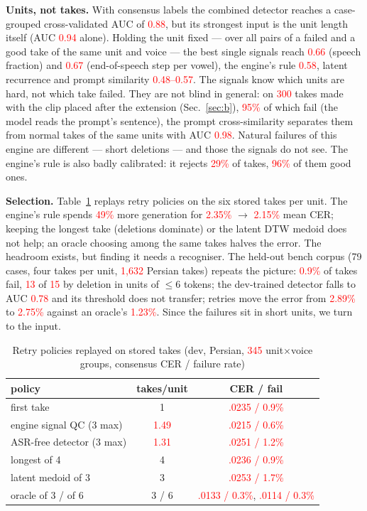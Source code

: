 \documentclass[conference]{IEEEtran}
\newcommand{\RES}[1]{\textcolor{red}{#1}}
\begin{document}
\textbf{Units, not takes.} With consensus labels the combined detector reaches a case-grouped
cross-validated AUC of \RES{0.88}, but its strongest input is the unit length itself (AUC \RES{0.94} alone).
Holding the unit fixed --- over all pairs of a failed and a good take of the same unit and voice --- the best
single signals reach \RES{0.66} (speech fraction) and \RES{0.67} (end-of-speech step per vowel), the engine's
rule \RES{0.58}, latent recurrence and prompt similarity \RES{0.48--0.57}. The signals know which units are
hard, not which take failed. They are not blind in general: on \RES{300} takes made with the clip placed
after the extension (Sec.~\ref{sec:b}), \RES{95\%} of which fail (the model reads the prompt's sentence), the prompt cross-similarity
separates them from normal takes of the same units with AUC \RES{0.98}. Natural failures of this engine are
different --- short deletions --- and those the signals do not see. The engine's rule is also badly calibrated: it rejects \RES{29\%} of takes,
\RES{96\%} of them good ones.

\textbf{Selection.} Table~\ref{tab:sel} replays retry policies on the six stored takes per unit. The
engine's rule spends \RES{49\%} more generation for \RES{2.35\%} $\to$ \RES{2.15\%} mean CER; keeping the
longest take (deletions dominate) or the latent DTW medoid does not help; an oracle choosing among the same
takes halves the error. The headroom exists, but finding it needs a recogniser. The held-out bench corpus (79 cases, four
takes per unit, \RES{1{,}632} Persian takes) repeats the picture: \RES{0.9\%} of takes fail, \RES{13} of
\RES{15} by deletion in units of $\le$6 tokens; the dev-trained detector falls to AUC \RES{0.78} and its
threshold does not transfer; retries move the error from \RES{2.89\%} to \RES{2.75\%} against an oracle's
\RES{1.23\%}. Since the failures sit in short units, we turn to the input.

\begin{table}[t]
\caption{Retry policies replayed on stored takes (dev, Persian, \RES{345} unit$\times$voice groups,
consensus CER / failure rate)}\label{tab:sel}
\centering
\begin{tabular}{lcc}
\toprule
policy & takes/unit & CER / fail \\
\midrule
first take & 1 & \RES{.0235 / 0.9\%} \\
engine signal QC (3 max) & \RES{1.49} & \RES{.0215 / 0.6\%} \\
ASR-free detector (3 max) & \RES{1.31} & \RES{.0251 / 1.2\%} \\
longest of 4 & 4 & \RES{.0236 / 0.9\%} \\
latent medoid of 3 & 3 & \RES{.0253 / 1.7\%} \\
oracle of 3 / of 6 & 3 / 6 & \RES{.0133 / 0.3\%}, \RES{.0114 / 0.3\%} \\
\bottomrule
\end{tabular}
\end{table}
\end{document}
